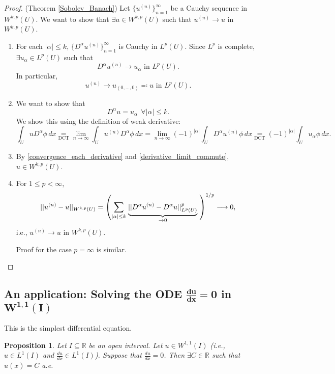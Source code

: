 \documentclass[12pt]{article}
\newtheorem{proposition}{Proposition}[section]
\theoremstyle{definition}
\begin{document}
\begin{proof}
(Theorem \ref{Sobolev_Banach}) Let $\{u^{(n)}\}_{n=1}^{\infty}$ be a Cauchy sequence in $W^{k,p}(U)$. We want to show that $\exists u\in W^{k,p}(U)$ such that $u^{(n)}\rightarrow u$ in $W^{k,p}(U)$.

\begin{enumerate}[label=\arabic*.]
\item\label{convergence_each_derivative} For each $|\alpha|\leq k$, $\{D^{\alpha}u^{(n)}\}_{n=1}^{\infty}$ is Cauchy in $L^p(U)$. Since $L^p$ is complete, $\exists u_{\alpha}\in L^p(U)$ such that
\[D^{\alpha}u^{(n)}\longrightarrow u_{\alpha}\text{ in }L^p(U).\]
In particular,
\[u^{(n)}\longrightarrow u_{(0,\ldots,0)}\eqqcolon u\text{ in }L^p(U).\]

\item\label{derivative_limit_commute} We want to show that
\[D^{\alpha}u=u_{\alpha}\ \ \forall|\alpha|\leq k.\]
We show this using the definition of weak derivative:
\[\int_UuD^{\alpha}\phi\,dx\underset{\text{DCT}}{=}\lim_{n\to\infty}\int_Uu^{(n)}D^{\alpha}\phi\,dx=\lim_{n\to\infty}(-1)^{|\alpha|}\int_UD^{\alpha}u^{(n)}\phi\,dx\underset{\text{DCT}}{=}(-1)^{|\alpha|}\int_Uu_{\alpha}\phi\,dx.\]

\item By \ref{convergence_each_derivative} and \ref{derivative_limit_commute}, $u\in W^{k,p}(U)$.

\item For $1\leq p<\infty$,
\[||u^{(n)}-u||_{W^{k,p}(U)}=\left(\sum_{|\alpha|\leq k}\right.\underbrace{||D^{\alpha}u^{(n)}-D^{\alpha}u||_{L^p(U)}^p}_{\to0}\left.\vphantom{\sum_{|\alpha|\leq k}}\right)^{1/p}\longrightarrow0,\]
i.e., $u^{(n)}\rightarrow u$ in $W^{k,p}(U)$.

Proof for the case $p=\infty$ is similar.
\end{enumerate}
\end{proof}

\subsection[An application: Solving the ODE \texorpdfstring{$\frac{du}{dx}=0$}{du/dx} in \texorpdfstring{$W^{1,1}(I)$}{the 1D Sobolev space}]{An application: Solving the ODE \texorpdfstring{$\boldsymbol{\frac{du}{dx}=0}$}{du/dx} in \texorpdfstring{$\boldsymbol{W^{1,1}(I)}$}{the 1D Sobolev space}}
This is the simplest differential equation.

\begin{proposition}
Let $I\subseteq\mathbb{R}$ be an open interval. Let $u\in W^{1,1}(I)$ (i.e., $u\in L^1(I)$ and $\frac{du}{dx}\in L^1(I)$). Suppose that $\frac{du}{dx}=0$. Then $\exists C\in\mathbb{R}$ such that $u(x)=C$ a.e.
\end{proposition}
\end{document}

